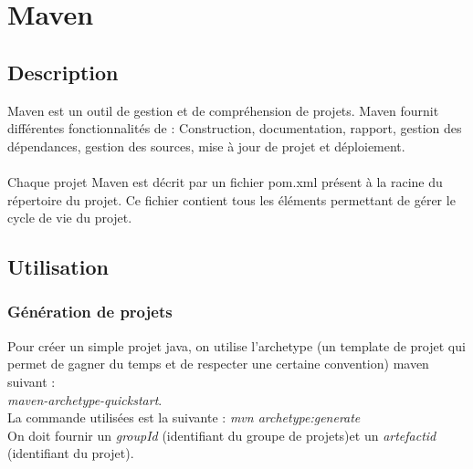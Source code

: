 \documentclass{article}
\begin{document}
\section{Maven}
\subsection{Description}
Maven est un outil de gestion et de compréhension de projets. Maven fournit différentes fonctionnalités de :
Construction, documentation, rapport, gestion des dépendances, gestion des sources, mise à jour de projet et déploiement. \\\\
Chaque projet Maven est décrit par un fichier pom.xml présent à la racine du répertoire du projet. Ce fichier
contient tous les éléments permettant de gérer le cycle de vie du projet.
\subsection{Utilisation}
\subsubsection{Génération de projets}
Pour créer un simple projet java, on utilise l'archetype (un template de projet qui permet de gagner du temps et de respecter une certaine convention) maven suivant : \\
\textit{maven-archetype-quickstart}. \\
La commande utilisées est la suivante : \textit{mvn archetype:generate} \\
On doit fournir un \textit{groupId} (identifiant du groupe de projets)et un \textit{artefactid} (identifiant du projet).\\
\end{document}
